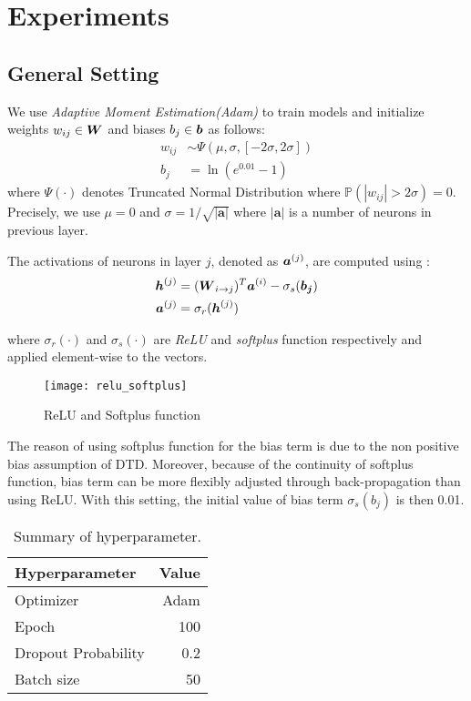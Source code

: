 \chapter{Experiments}
\label{cha:chapter4}


\section{General Setting}\label{sec:setup}
 
 We use \textit{Adaptive Moment Estimation(Adam)}\cite{KingmaAdamMethodStochastic2014} to train models and initialize weights $w_{ij} \in \patmatrix{W}$ and biases $b_{j} \in \patvector{b}$ as follows:
\begin{align*}
	w_{ij} &\sim \Psi( \mu, \sigma, [-2\sigma, 2\sigma]) \\
	b_{j} &= \ln(e^{0.01} - 1)
\end{align*}
where $\Psi(\cdot)$ denotes Truncated Normal Distribution where $\mathbb{P}(|w_{ij}| > 2\sigma) = 0$. Precisely, we use $\mu=0$ and $\sigma = 1/\sqrt{|\boldsymbol{a}|}$ where $|\boldsymbol{a}|$ is a number of neurons in previous layer.

The activations of neurons in layer $j$, denoted as $\patvector{a}^{(j)}$, are computed using :
\begin{align*}
\patvector{h}^{(j)}  &=  	(\patmatrix{W}_{ i \rightarrow j })^T \patvector{a}^{(i)} - \sigma_{s}(\patvector{b_j}) \\
	\patvector{a}^{(j)}  &=  	\sigma_{r} (	\patvector{h}^{(j)} )
\end{align*}

where $\sigma_r(\cdot)$ and $\sigma_s(\cdot)$ are \textit{ReLU} and \textit{softplus} function respectively and applied element-wise to the vectors.

 \begin{figure}[!hbt]
\centering
\texttt{[image: relu\_softplus]}
\caption{ReLU and Softplus function} 
\label{fig:relu_softplus}
\end{figure}


The reason of using softplus function for the bias term is due to the non positive bias assumption of DTD. Moreover, because of the continuity of softplus function, bias term can be more flexibly adjusted through back-propagation than using  ReLU. With this setting, the initial value of bias term  $\sigma_{s}(b_j)$ is then 0.01.


\begin{table}[!htb]
\centering
\begin{tabular}{l|r}
\textbf{Hyperparameter} & \multicolumn{1}{l}{\textbf{Value}} \\ \hline
Optimizer               & Adam                               \\
Epoch     & 100                                \\
Dropout Probability     & 0.2                               \\
Batch size              & 50                                
\end{tabular}
\caption{Summary of hyperparameter.}
\label{tab:hyper_summary}
\end{table}


